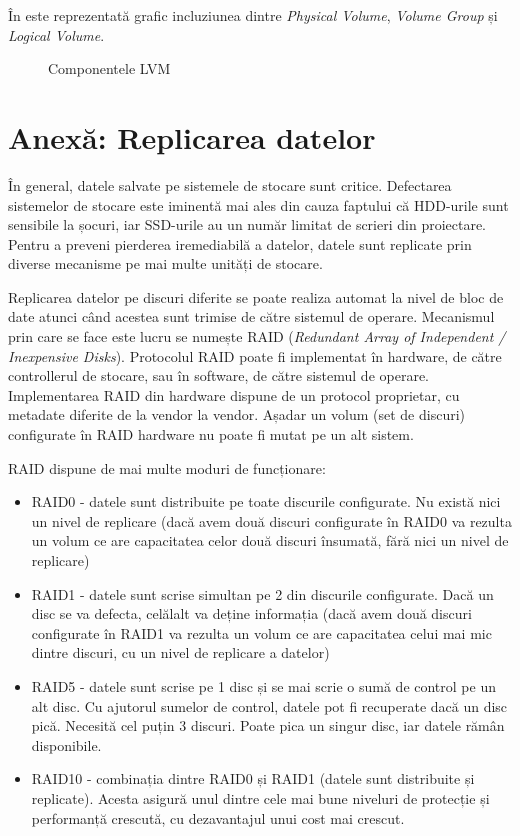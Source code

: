 În  este reprezentată grafic incluziunea
dintre \textit{Physical Volume}, \textit{Volume Group} și \textit{Logical Volume}.

\begin{figure}[htbp]
  \centering
  \def\svgwidth{\columnwidth}
  
  \caption{Componentele LVM}
  \label{fig:storage:lvm}
\end{figure}

\section{Anexă: Replicarea datelor}
\label{sec:storage:raid}

În general, datele salvate pe sistemele de stocare sunt critice. Defectarea
sistemelor de stocare este iminentă mai ales din cauza faptului că HDD-urile
sunt sensibile la șocuri, iar SSD-urile au un număr limitat de scrieri din
proiectare. Pentru a preveni pierderea iremediabilă a datelor, datele sunt
replicate prin diverse mecanisme pe mai multe unități de stocare.

Replicarea datelor pe discuri diferite se poate realiza automat la nivel de bloc
de date atunci când acestea sunt trimise de către sistemul de operare.
Mecanismul prin care se face este lucru se numește RAID  (\textit{Redundant Array of
Independent / Inexpensive Disks}). Protocolul RAID poate fi implementat în hardware,
de către controllerul de stocare, sau în software, de către sistemul de operare.
Implementarea RAID din hardware dispune de un protocol proprietar, cu metadate diferite de
la vendor la vendor. Așadar un volum (set de discuri) configurate în RAID hardware nu
poate fi mutat pe un alt sistem.

RAID dispune de mai multe moduri de funcționare:

\begin{itemize}
  \item RAID0 - datele sunt distribuite pe toate discurile configurate. Nu
    există nici un nivel de replicare (dacă avem două discuri
    configurate în RAID0 va rezulta un volum ce are capacitatea
    celor două discuri însumată, fără nici un nivel de replicare)
  \item RAID1 - datele sunt scrise simultan pe 2 din discurile configurate. Dacă un
    disc se va defecta, celălalt va deține informația (dacă avem
    două discuri configurate în RAID1 va rezulta un volum ce are
    capacitatea celui mai mic dintre discuri, cu un nivel de
    replicare a datelor)
  \item RAID5 - datele sunt scrise pe 1 disc și se mai scrie o sumă de
    control pe un alt disc. Cu ajutorul sumelor de control, datele
    pot fi recuperate dacă un disc pică. Necesită cel puțin 3
    discuri. Poate pica un singur disc, iar datele rămân
    disponibile.
  \item RAID10 - combinația dintre RAID0 și RAID1 (datele sunt distribuite
    și replicate). Acesta asigură unul dintre cele mai bune niveluri
    de protecție și performanță crescută, cu dezavantajul unui cost mai crescut.
\end{itemize}

